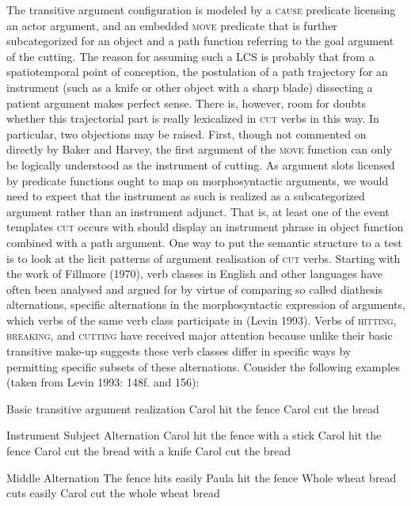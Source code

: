 The transitive argument configuration is modeled by a \textsc{cause} predicate licensing an actor argument, and an embedded \textsc{move} predicate that is further subcategorized for an object and a path function referring to the goal argument of the cutting. The reason for assuming such a LCS is probably that from a spatiotemporal point of conception, the postulation of a path trajectory for an instrument (such as a knife or other object with a sharp blade) dissecting a patient argument makes perfect sense. There is, however, room for doubts whether this trajectorial part is really lexicalized in \textsc{cut} verbs in this way. In particular, two objections may be raised. First, though not commented on directly by Baker and Harvey, the first argument of the \textsc{move} function can only be logically understood as the instrument of cutting. As argument slots licensed by predicate functions ought to map on morphosyntactic arguments, we would need to expect that the instrument as such is realized as a subcategorized argument rather than an instrument adjunct. That is, at least one of the event templates \textsc{cut} occurs with should display an instrument phrase in object function combined with a path argument. One way to put the semantic structure to a test is to look at the licit patterns of argument realisation of \textsc{cut} verbs. Starting with the work of Fillmore (1970), verb classes in English and other languages have often been analysed and argued for by virtue of comparing so called diathesis alternations, specific alternations in the morphosyntactic expression of arguments, which verbs of the same verb class participate in (Levin 1993). Verbs of \textsc{hitting}, \textsc{breaking}, and \textsc{cutting} have received major attention because unlike their basic transitive make-up suggests these verb classes differ in specific ways by permitting specific subsets of these alternations. Consider the following examples (taken from Levin 1993: 148f. and 156):

\ea Basic transitive argument realization \label{alt01}
\ea Carol hit the fence
\ex Carol cut the bread
\z
\z

\ea Instrument Subject Alternation \label{alt02}
\ea Carol hit the fence with a stick
\ex Carol hit the fence
\ex Carol cut the bread with a knife
\ex Carol cut the bread
\z
\z

\ea Middle Alternation \label{alt03}
\ea \judge*The fence hits easily
\ex Paula hit the fence
\ex Whole wheat bread cuts easily
\ex Carol cut the whole wheat bread
\z
\z

